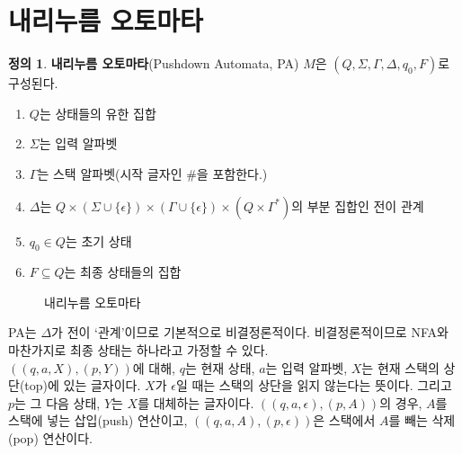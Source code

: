 \documentclass[b5paper, 11pt]{book}
\theoremstyle{definition}
\newtheorem{defn}{정의}[chapter]
\begin{document}
\section{내리누름 오토마타}
\begin{defn}
    \textbf{내리누름 오토마타}(Pushdown Automata, PA) $M$은 $(Q, \Sigma, 
    \Gamma, \Delta, q_0, F)$로 구성된다. 
    \begin{enumerate}
        \item $Q$는 상태들의 유한 집합
        \item $\Sigma$는 입력 알파벳
        \item $\Gamma$는 스택 알파벳(시작 글자인 \#을 포함한다.)
        \item $\Delta$는 $Q \times (\Sigma \cup \{\epsilon\}) \times (\Gamma \cup \{\epsilon\}) \times (Q \times \Gamma^*)$의 부분 집합인 전이 관계
        \item $q_0 \in Q$는 초기 상태
        \item $F \subseteq Q$는 최종 상태들의 집합
    \end{enumerate}
\end{defn}
\begin{figure}[!ht]
    \centering
    \caption{내리누름 오토마타}
\end{figure}
PA는 $\Delta$가 전이 `관계'이므로 기본적으로 비결정론적이다. 비결정론적이므로 NFA와 마찬가지로 최종 상태는 하나라고 가정할 수 있다. \\ 
$((q, a, X), (p, Y))$에 대해, $q$는 현재 상태, $a$는 입력 알파벳, $X$는 현재 스택의 상단(top)에 있는 글자이다. $X$가 $\epsilon$일 때는 스택의 상단을 읽지 않는다는 뜻이다. 그리고 $p$는 그 다음 상태, $Y$는 $X$를 대체하는 글자이다. $((q,a,\epsilon),(p,A))$의 경우, $A$를 스택에 넣는 삽입(push) 연산이고, $((q,a,A),(p,\epsilon))$은 스택에서 $A$를 빼는 삭제(pop) 연산이다. \\
\end{document}
